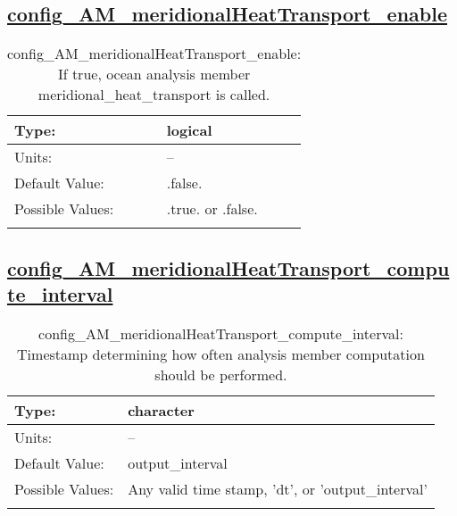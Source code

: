 \subsection[config\_AM\_meridionalHeatTransport\_enable]{\hyperref[sec:nm_tab_AM_meridionalHeatTransport]{config\_AM\_meridionalHeatTransport\_enable}}
\label{subsec:nm_sec_config_AM_meridionalHeatTransport_enable}
\begin{center}
\begin{longtable}{| p{2.0in} || p{4.0in} |}
    \hline
    Type: & logical \\
    \hline
    Units: & -- \\
    \hline
    Default Value: & .false. \\
    \hline
    Possible Values: & .true. or .false. \\
    \hline
    \caption{config\_AM\_meridionalHeatTransport\_enable: If true, ocean analysis member meridional\_heat\_transport is called.}
\end{longtable}
\end{center}
\subsection[config\_AM\_meridionalHeatTransport\_compute\_interval]{\hyperref[sec:nm_tab_AM_meridionalHeatTransport]{config\_AM\_meridionalHeatTransport\_compute\_interval}}
\label{subsec:nm_sec_config_AM_meridionalHeatTransport_compute_interval}
\begin{center}
\begin{longtable}{| p{2.0in} || p{4.0in} |}
    \hline
    Type: & character \\
    \hline
    Units: & -- \\
    \hline
    Default Value: & output\_interval \\
    \hline
    Possible Values: & Any valid time stamp, 'dt', or 'output\_interval' \\
    \hline
    \caption{config\_AM\_meridionalHeatTransport\_compute\_interval: Timestamp determining how often analysis member computation should be performed.}
\end{longtable}
\end{center}
